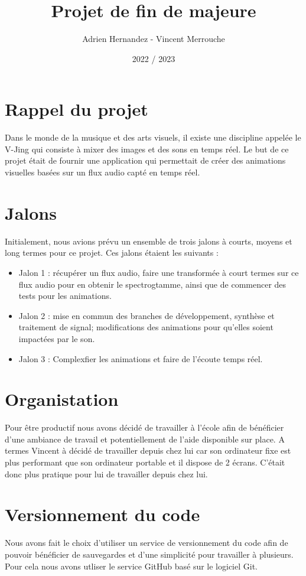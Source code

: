 \documentclass{article}
\title{Projet de fin de majeure}
\author{Adrien Hernandez - Vincent Merrouche}
\date{2022 / 2023}
\begin{document}
\maketitle

\section{Rappel du projet}
Dans le monde de la musique et des arts visuels, il existe une discipline appelée le V-Jing qui consiste à mixer des images et des sons en temps réel. 
Le but de ce projet était de fournir une application qui permettait de créer des animations visuelles basées sur un flux audio capté en temps réel.

\section{Jalons}
Initialement, nous avions prévu un ensemble de trois jalons à courts, moyens et long termes pour ce projet. Ces jalons étaient les suivants :
\begin{itemize}
    \item Jalon 1 : récupérer un flux audio, faire une transformée à court termes sur ce flux audio pour en obtenir le spectrogtamme, ainsi que de commencer des tests pour les animations.
    \item Jalon 2 : mise en commun des branches de développement, synthèse et traitement de signal; modifications des animations pour qu'elles soient impactées par le son.
    \item Jalon 3 : Complexfier les animations et faire de l'écoute temps réel.
\end{itemize}



\section{Organistation}
Pour être productif nous avons décidé de travailler à l'école afin de bénéficier d'une ambiance de travail et potentiellement de l'aide disponible sur place. A termes Vincent à décidé de travailler depuis chez lui car son ordinateur fixe est plus performant que son ordinateur portable et il dispose de 2 écrans. C'était donc plus pratique pour lui de travailler depuis chez lui. 

\section{Versionnement du code}
Nous avons fait le choix d'utiliser un service de versionnement du code afin de pouvoir bénéficier de sauvegardes et d'une simplicité pour travailler à plusieurs. Pour cela nous avons utliser le service GitHub basé sur le logiciel Git. 
\end{document}

